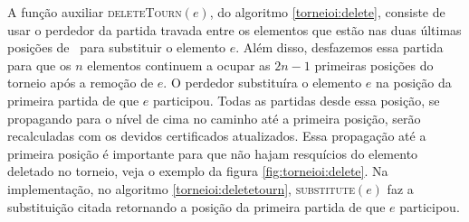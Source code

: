 

A função auxiliar \textsc{deleteTourn}$(e)$, do algoritmo
\ref{torneioi:delete}, consiste de usar o perdedor
da partida travada entre os elementos que estão nas duas últimas
posições de \torneio~para substituir o elemento $e$.
Além disso, desfazemos essa partida para que os
$n$ elementos continuem a ocupar as $2n - 1$ primeiras posições
do torneio após a remoção de $e$. O perdedor
substituíra o elemento $e$ na posição da
primeira partida de que $e$ participou. Todas as partidas desde
essa posição, se propagando para o nível de cima no caminho até a
primeira posição, serão recalculadas com os devidos certificados
atualizados. Essa propagação até a primeira posição é importante
para que não hajam resquícios do elemento deletado no torneio,
veja o exemplo da figura \ref{fig:torneioi:delete}. Na implementação,
no algoritmo \ref{torneioi:deletetourn}, \textsc{substitute}$(e)$ faz a
substituição citada retornando a posição da primeira partida
de que $e$ participou.




